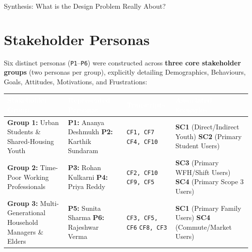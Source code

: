 \documentclass[12pt, a4paper]{article}
\begin{document}
\begin{synthesisbox}{Synthesis: What is the Design Problem Really About?}
\end{synthesisbox}

\section{Stakeholder Personas}
Six distinct personas (\texttt{P1}--\texttt{P6}) were constructed across \textbf{three core stakeholder groups} (two personas per group), explicitly detailing Demographics, Behaviours, Goals, Attitudes, Motivations, and Frustrations:

{\footnotesize
{}
\begin{longtable}{|>{\raggedright\arraybackslash}p{4.3cm}|>{\raggedright\arraybackslash}p{4.5cm}|>{\raggedright\arraybackslash}p{2.4cm}|>{\raggedright\arraybackslash}p{4.3cm}|}
\hline
\rowcolor{cNavy}
\textcolor{white}{\textbf{Stakeholder Group}} & \textcolor{white}{\textbf{Represented Personas}} & \textcolor{white}{\textbf{Transcripts}} & \textcolor{white}{\textbf{Associated Scenarios}} \\
\hline
\textbf{Group 1:} Urban Students \& Shared-Housing Youth & \textbf{P1:} Ananya Deshmukh \newline \textbf{P2:} Karthik Sundaram & \texttt{CF1, CF7} \cite{cf1, cf7} \newline \texttt{CF4, CF10} \cite{cf4, cf10} & \textbf{SC1} (Direct/Indirect Youth) \newline \textbf{SC2} (Primary Student Users) \\
\hline
\textbf{Group 2:} Time-Poor Working Professionals & \textbf{P3:} Rohan Kulkarni \newline \textbf{P4:} Priya Reddy & \texttt{CF2, CF10} \cite{cf2, cf10} \newline \texttt{CF9, CF5} \cite{cf9, cf5} & \textbf{SC3} (Primary WFH/Shift Users) \newline \textbf{SC4} (Primary Scope 3 Users) \\
\hline
\textbf{Group 3:} Multi-Generational Household Managers \& Elders & \textbf{P5:} Sunita Sharma \newline \textbf{P6:} Rajeshwar Verma & \texttt{CF3, CF5, CF6} \cite{cf3, cf5, cf6} \newline \texttt{CF8, CF3} \cite{cf8, cf3} & \textbf{SC1} (Primary Family Users) \newline \textbf{SC4} (Commute/Market Users) \\
\hline
\end{longtable}
}
\end{document}
